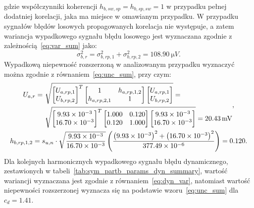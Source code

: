 gdzie współczynniki koherencji $h_{b,sw,sp} = h_{b,sp,sw} = 1$ w przypadku pełnej dodatniej korelacji, jaka ma miejsce w omawianym przypadku. W przypadku sygnałów błędów losowych propagowanych korelacja nie występuje, a zatem wariancja wypadkowego sygnału błędu losowego jest wyznaczana zgodnie z zależnością~\eqref{eq:var_sum} jako:
\begin{equation}
\sigma_{b,r}^{2} = \sigma_{b,rp,1}^{2} + \sigma_{b,rp,2}^{2} = \qty{108.90}{\micro V} \label{eq:sym_partb_rand_var}.
\end{equation}
Wypadkową niepewność rozszerzoną w analizowanym przypadku wyznaczyć można zgodnie z równaniem~\eqref{eq:unc_sum}, przy czym:
\begin{gather}
\begin{split}
U_{a,r} = ~ & \sqrt{
\begin{bmatrix}
U_{a,rp,1} \\ U_{b,rp,2}
\end{bmatrix}^{T}
\begin{bmatrix}
1            & h_{a,rp,1,2} \\
h_{a,rp,2,1} & 1
\end{bmatrix}
\begin{bmatrix}
U_{a,rp,1} \\ U_{b,rp,2}
\end{bmatrix}} = ~ \\ & \sqrt{
\begin{bmatrix}
\num{9.93e-3} \\ \num{16.70e-3}
\end{bmatrix}^{T}
\begin{bmatrix}
1.000 & 0.120 \\
0.120 & 1.000
\end{bmatrix}
\begin{bmatrix}
\num{9.93e-3} \\ \num{16.70e-3}
\end{bmatrix}} = \qty{20.43}{mV}
\end{split}
\label{eq:sym_partb_rand_uncert}, \\
h_{b,rp,1,2} = s_{u,n} \cdot \sqrt{\frac{\num{9.93e-3}}{\num{16.70e-3}}} \left( \frac{\left(\num{9.93e-3}\right)^{2} + \left(\num{16.70e-3}\right)^{2}}{\num{377.49e-6}} \right) = 0.120 \label{eq:sym_partb_coher_rp_1_2}.
\end{gather}
Dla kolejnych harmonicznych wypadkowego sygnału błędu dynamicznego, zestawionych w tabeli~\ref{tab:sym_partb_params_dyn_summary}, wartość wariancji wyznaczana jest zgodnie z równaniem~\eqref{eq:dyn_var}, natomiast wartość niepewności rozszerzonej wyznacza się na podstawie wzoru~\eqref{eq:unc_sum} dla $c_{d} = 1.41$.

